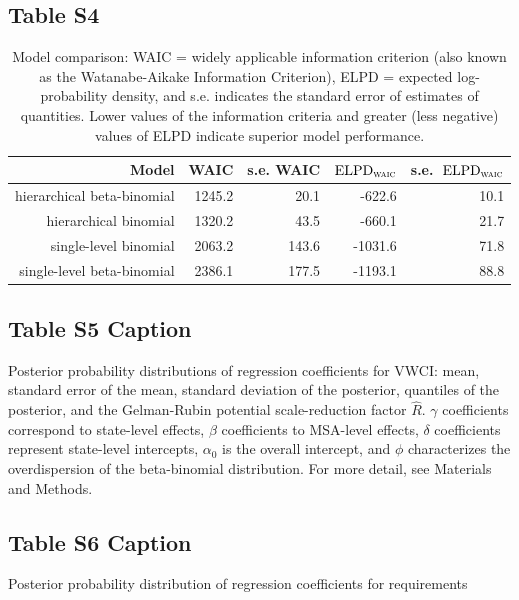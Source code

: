 \documentclass[draft]{agujournal}
\begin{document}
\subsection*{Table S4}
\begin{table}[H]
\centering
\begin{tabular}{rrrrr}
  \hline
Model & WAIC & s.e. WAIC & $\text{ELPD}_{\text{\scshape waic}}$ & s.e.\ $\text{ELPD}_{\text{\scshape waic}}$ \\ 
  \hline
hierarchical beta-binomial & 1245.2 & 20.1 & -622.6 & 10.1 \\ 
  hierarchical binomial & 1320.2 & 43.5 & -660.1 & 21.7 \\ 
  single-level binomial & 2063.2 & 143.6 & -1031.6 & 71.8 \\ 
  single-level beta-binomial & 2386.1 & 177.5 & -1193.1 & 88.8 \\ 
   \hline
\end{tabular}
\caption[Model comparison: WAIC]{Model comparison: WAIC = widely applicable information criterion (also known as the Watanabe-Aikake Information Criterion), ELPD = expected log-probability density, and s.e. indicates the standard error of estimates of quantities. Lower values of the information criteria and greater (less negative) values of ELPD indicate superior model performance.} 
\label{tab:waic}
\end{table}

\subsection*{Table S5 Caption}
\begin{table}[H]
\centering
\caption{Posterior probability distributions of regression coefficients for VWCI: mean, standard error of the mean, standard deviation of the posterior, quantiles of the posterior, and the Gelman-Rubin potential scale-reduction factor $\hat R$. $\gamma$ coefficients correspond to state-level effects, $\beta$ coefficients to MSA-level effects, $\delta$ coefficients represent state-level intercepts, $\alpha_0$ is the overall intercept, and $\phi$ characterizes the overdispersion of the beta-binomial distribution. For more detail, see Materials and Methods.}
\label{tab:vwci_posterior}
\end{table}


\subsection*{Table S6 Caption}
\begin{table}[H]
\centering
\caption{Posterior probability distribution of regression coefficients for requirements}
\label{tab:req_posterior}
\end{table}
\end{document}
